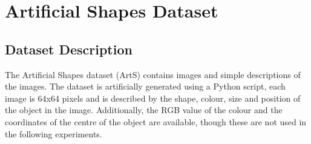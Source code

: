 \newpage
\section{Artificial Shapes Dataset}
\subsection{Dataset Description}
The Artificial Shapes dataset (ArtS) contains images and simple descriptions of the images. The dataset is artificially generated using a Python script, each image is 64x64 pixels and is described by the shape, colour, size and position of the object in the image. Additionally, the \ac{RGB} value of the colour and the coordinates of the centre of the object are available, though these are not used in the following experiments. 

